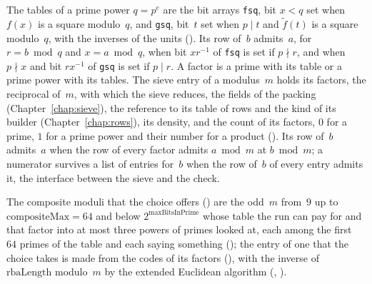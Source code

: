 \begin{definition}\label{def:sieveEntry}
  \leanok
  The tables of a prime power $q = p^e$ are the bit arrays \verb|fsq|, bit $x < q$ set when $f(x)$
  is a square modulo~$q$, and \verb|gsq|, bit~$t$ set when $p \mid t$ and $\tilde f(t)$ is a square
  modulo~$q$, with the inverses of the units (). Its row of~$b$
  admits~$a$, for $r = b \bmod q$ and $x = a \bmod q$, when bit $x r^{-1}$ of \verb|fsq| is set if
  $p \nmid r$, and when $p \nmid x$ and bit $r x^{-1}$ of \verb|gsq| is set if $p \mid r$. A
  factor is a prime with its table or a prime power with its tables. The sieve entry of a
  modulus~$m$ holds its factors, the reciprocal of~$m$, with which the sieve reduces, the fields of
  the packing (Chapter~\ref{chap:sieve}), the reference to its table of rows and the kind of its
  builder (Chapter~\ref{chap:rows}), its density, and the count of its factors, $0$ for a prime,
  $1$ for a prime power and their number for a product (). Its row
  of~$b$ admits~$a$ when the row of every factor admits $a \bmod m$ at $b \bmod m$; a numerator
  survives a list of entries for~$b$ when the row of~$b$ of every entry admits it, the interface
  between the sieve and the check.
\end{definition}

The composite moduli that the choice offers () are the odd~$m$ from~$9$
up to $\mathrm{compositeMax} = 64$ and below $2^{\mathrm{maxBitsInPrime}}$ whose table the run can
pay for and that factor into at most three powers of primes looked at, each among the first~$64$
primes of the table and each saying something (); the entry of
one that the choice takes is made from the codes of its factors (),
with the inverse of $\mathrm{rbaLength}$ modulo~$m$ by the extended Euclidean algorithm
(, ).

